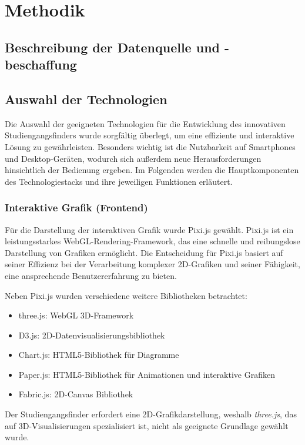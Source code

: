 \section{Methodik}

\subsection{Beschreibung der Datenquelle und -beschaffung}

\subsection{Auswahl der Technologien}
Die Auswahl der geeigneten Technologien für die Entwicklung des innovativen 
Studiengangsfinders wurde sorgfältig überlegt, um eine effiziente und
interaktive Lösung zu gewährleisten. Besonders wichtig ist die Nutzbarkeit auf
Smartphones und Desktop-Geräten, wodurch sich außerdem neue Herausforderungen
hinsichtlich der Bedienung ergeben. Im Folgenden werden die Hauptkomponenten des
Technologiestacks und ihre jeweiligen Funktionen erläutert.

\subsubsection{Interaktive Grafik (Frontend)}
Für die Darstellung der interaktiven Grafik wurde Pixi.js gewählt. Pixi.js ist
ein leistungsstarkes WebGL-Rendering-Framework, das eine schnelle und
reibungslose Darstellung von Grafiken ermöglicht. \parencite{pixijs} Die
Entscheidung für Pixi.js basiert auf seiner Effizienz bei der Verarbeitung
komplexer 2D-Grafiken und seiner Fähigkeit, eine ansprechende Benutzererfahrung
zu bieten.

Neben Pixi.js wurden verschiedene weitere Bibliotheken betrachtet:
\begin{itemize}
    \item three.js: WebGL 3D-Framework
    \item D3.js: 2D-Datenvisualisierungsbibliothek
    \item Chart.js: HTML5-Bibliothek für Diagramme
    \item Paper.js: HTML5-Bibliothek für Animationen und interaktive Grafiken
    \item Fabric.js: 2D-Canvas Bibliothek
\end{itemize}


Der Studiengangsfinder erfordert eine 2D-Grafikdarstellung, weshalb
\textit{three.js}, das auf 3D-Visualisierungen spezialisiert ist, nicht als
geeignete Grundlage gewählt wurde. \parencite{threejs}

